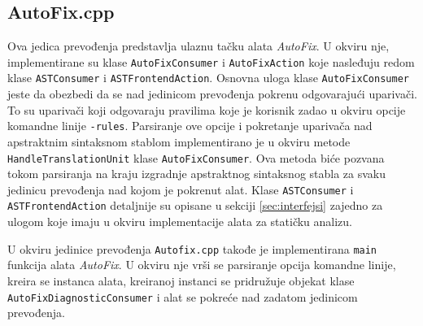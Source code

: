 \documentclass[12pt,oneside]{memoir}
\begin{document}
\subsection{AutoFix.cpp}
Ova jedica prevođenja predstavlja ulaznu ta\v{c}ku alata \textit{AutoFix}. U okviru nje, implementirane su klase \texttt{AutoFixConsumer} i \texttt{AutoFixAction} koje nasleđuju redom klase \texttt{ASTConsumer} i \texttt{ASTFrontendAction}. Osnovna uloga klase \texttt{AutoFixConsumer} jeste da obezbedi da se nad jedinicom prevođenja pokrenu odgovaraju\'{c}i upariva\v{c}i. To su upariva\v{c}i koji odgovaraju pravilima koje je korisnik zadao u okviru opcije komandne linije \texttt{-rules}. Parsiranje ove opcije i  pokretanje upariva\v{c}a nad apstraktnim sintaksnom stablom implementirano je u okviru metode \texttt{HandleTranslationUnit} klase \texttt{AutoFixConsumer}. Ova metoda bi\'{c}e pozvana tokom parsiranja na kraju izgradnje apstraktnog sintaksnog stabla za svaku jedinicu prevođenja nad kojom je pokrenut alat. Klase \texttt{ASTConsumer} i \texttt{ASTFrontendAction} detaljnije su opisane u sekciji \ref{sec:interfejsi} zajedno za ulogom koje imaju u okviru implementacije alata za stati\v{c}ku analizu. \par
U okviru jedinice prevođenja \texttt{Autofix.cpp} takođe je implementirana \texttt{main} funkcija alata \textit{AutoFix}. U okviru nje vr\v{s}i se parsiranje opcija komandne linije, kreira se instanca alata, kreiranoj instanci se pridru\v{z}uje objekat klase \texttt{AutoFixDiagnosticConsumer} i alat se pokre\'{c}e nad zadatom jedinicom prevođenja.
\end{document}
